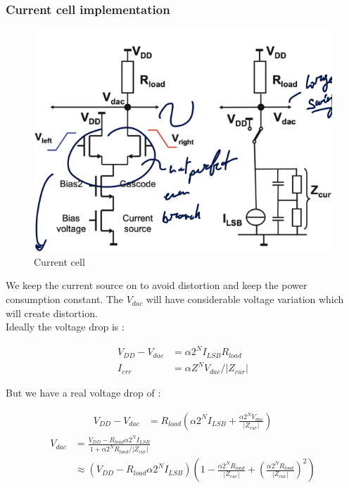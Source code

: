 \documentclass{report}
\begin{document}
\subsubsection{Current cell implementation}

\begin{figure}
    \centering
    \includegraphics[width=0.95\linewidth]{img/current_cell.png}
    \caption{Current cell}
    \label{fig:current-cell-label}
\end{figure}

We keep the current source on to avoid distortion and keep the power consumption constant. The $V_{dac}$ will have considerable voltage variation which will create distortion.\\

Ideally the voltage drop is : 

\begin{align}
    V_{DD} - V_{dac} &= \alpha 2^N I_{LSB} R_{load}\\
    I_{err} &= \alpha Z^N V_{dac} / |Z_{cur}|
\end{align}

But we have a real voltage drop of :

\begin{align}
    V_{DD} - V_{dac} &= R_{load} \left( \alpha 2^N I_{LSB} + \frac{\alpha 2^N V_{dac}}{|Z_{cur}|} \right)
\end{align}
\begin{align}
    V_{dac} &= \frac{V_{DD} - R_{load} \alpha 2^N I_{LSB}}{1 + \alpha 2^N R_{load} / |Z_{cur}|}\\
    &\approx (V_{DD} - R_{load} \alpha 2^N I_{LSB}) \left( 1- \frac{\alpha 2^N R_{load}}{|Z_{cur}|}  + \left( \frac{\alpha 2^N R_{load}}{|Z_{cur}|} \right)^2 \right)
\end{align}
\end{document}
